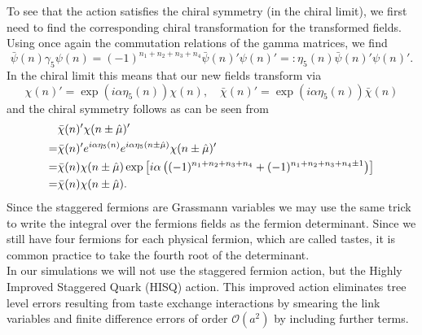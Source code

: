 To see that the action satisfies the chiral symmetry (in the chiral limit), we first need to find the corresponding chiral transformation for the transformed fields. Using once again the commutation relations of the gamma matrices, we find
\begin{equation}
    \bar\psi(n)\gamma_5\psi(n)=(-1)^{n_1+n_2+n_3+n_4}\bar\psi(n)'\psi(n)'=:\eta_5(n)\bar\psi(n)'\psi(n)'.
\end{equation}
In the chiral limit this means that our new fields transform via
\begin{equation}
    \chi(n)'=\exp(i\alpha\eta_5(n))\chi(n),\quad\bar\chi(n)'=\exp(i\alpha\eta_5(n))\bar\chi(n)
\end{equation}
and the chiral symmetry follows as can be seen from
\begin{align}
    &\bar\chi(n)'\chi(n\pm\hat\mu)'\\
    =&\bar\chi(n)'e^{i\alpha\eta_5(n)}e^{i\alpha\eta_5(n\pm\hat\mu)}\chi(n\pm\hat\mu)'\\
    =&\bar\chi(n)\chi(n\pm\hat\mu)\exp\left[i\alpha\left((-1)^{n_1+n_2+n_3+n_4}+(-1)^{n_1+n_2+n_3+n_4\pm1}\right)\right]\\
    =&\bar\chi(n)\chi(n\pm\hat\mu).
\end{align}
Since the staggered fermions are Grassmann variables we may use the same trick to write the integral over the fermions fields as the fermion determinant. Since we still have four fermions for each physical fermion, which are called tastes, it is common practice to take the fourth root of the determinant.\\
In our simulations we will not use the staggered fermion action, but the Highly Improved Staggered Quark (HISQ) action\cite{hisq}. This improved action eliminates tree level errors resulting from taste exchange interactions by smearing the link variables and finite difference errors of order $\mathcal O(a^2)$ by including further terms.\cite{bielefeldPHD}